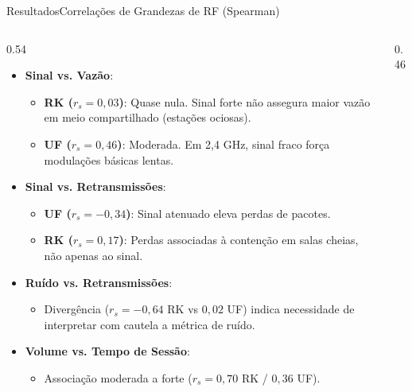 \documentclass[10pt,brazil]{beamer}
\begin{document}
    \begin{frame}[label=slide_correlacoes]{Resultados}{Correlações de Grandezas de RF (Spearman)}
        \begin{columns}
            \begin{column}{0.54\textwidth}
                \scriptsize
                \begin{itemize}
                    \setlength{\itemsep}{3pt}
                    \item \textbf{Sinal vs. Vazão}:
                    \begin{itemize}
                        \item \textbf{RK ($r_s = 0,03$)}: Quase nula. Sinal forte não assegura maior vazão em meio compartilhado (estações ociosas).
                        \item \textbf{UF ($r_s = 0,46$)}: Moderada. Em 2,4 GHz, sinal fraco força modulações básicas lentas.
                    \end{itemize}
                    \item \textbf{Sinal vs. Retransmissões}:
                    \begin{itemize}
                        \item \textbf{UF ($r_s = -0,34$)}: Sinal atenuado eleva perdas de pacotes.
                        \item \textbf{RK ($r_s = 0,17$)}: Perdas associadas à contenção em salas cheias, não apenas ao sinal.
                    \end{itemize}
                    \item \textbf{Ruído vs. Retransmissões}:
                    \begin{itemize}
                        \item Divergência ($r_s = -0,64$ RK vs $0,02$ UF) indica necessidade de interpretar com cautela a métrica de ruído.
                    \end{itemize}
                    \item \textbf{Volume vs. Tempo de Sessão}:
                    \begin{itemize}
                        \item Associação moderada a forte ($r_s = 0,70$ RK / $0,36$ UF).
                    \end{itemize}
                \end{itemize}
            \end{column}
            \begin{column}{0.46\textwidth}

\end{column}
\end{columns}
\end{frame}
\end{document}
